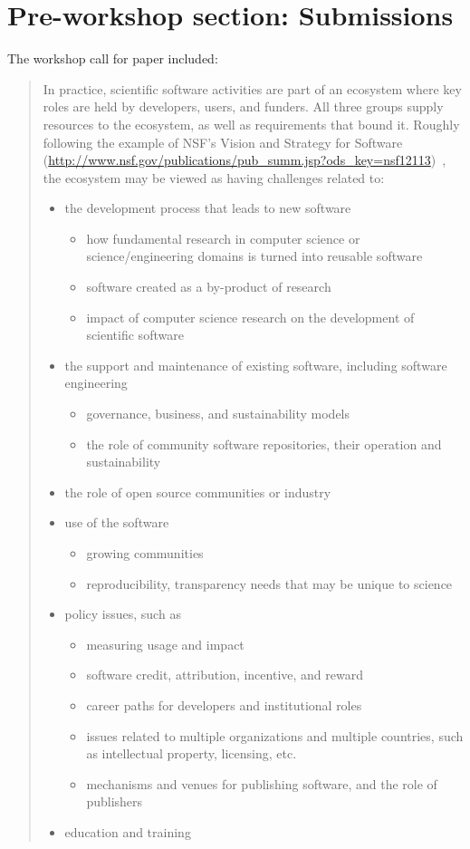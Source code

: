 \documentclass[11pt, oneside]{amsart}
\begin{document}
\section{Pre-workshop section: Submissions}

The workshop call for paper included:

\begin{quote}
In practice, scientific software activities are part of an ecosystem where key roles are held by developers, users, and funders.  All three groups supply resources to the ecosystem, as well as requirements that bound it.  Roughly following the example of NSF's Vision and Strategy for Software (\url{http://www.nsf.gov/publications/pub_summ.jsp?ods_key=nsf12113})~\cite{NSF_software_vision}, the ecosystem may be viewed as having challenges related to:

\begin{itemize}
\item the development process that leads to new software
\begin{itemize}
\item how fundamental research in computer science or science/engineering domains is turned  into reusable software
\item software created as a by-product of research
\item impact of computer science research on the development of scientific software
\end{itemize}
\item the support and maintenance of existing software, including software engineering
\begin{itemize}
\item governance, business, and sustainability models
\item the role of community software repositories, their operation and sustainability
\end{itemize}
\item the role of open source communities or industry
\item use of the software
\begin{itemize}
\item growing communities
\item reproducibility, transparency needs that may be unique to science
\end{itemize}
\item policy issues, such as
\begin{itemize}
\item measuring usage and impact
\item software credit, attribution, incentive, and reward
\item career paths for developers and institutional roles
\item issues related to multiple organizations and multiple countries, such as intellectual property, licensing, etc.
\item mechanisms and venues for publishing software, and the role of publishers
\end{itemize}
\item education and training
\end{itemize}

\end{quote}
\end{document}
